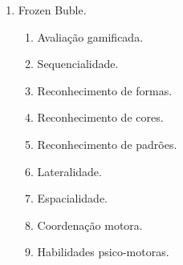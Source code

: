 \begin{enumerate}
	\item Frozen Buble.
	\begin{enumerate}
		\item Avaliação gamificada.
		\item Sequencialidade.
		\item Reconhecimento de formas.
		\item Reconhecimento de cores.
		\item Reconhecimento de padrões.
		\item Lateralidade.
		\item Espacialidade.
		\item Coordenação motora.
		\item Habilidades psico-motoras.
	\end{enumerate}
\end{enumerate}